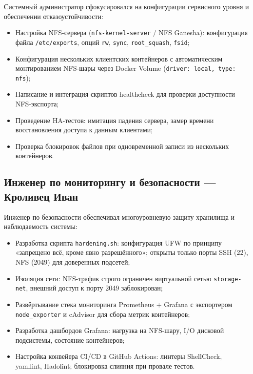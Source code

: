 \documentclass[14pt,a4paper]{extarticle}
\begin{document}
	Системный администратор сфокусировался на конфигурации сервисного уровня и
	обеспечении отказоустойчивости:
	
	\begin{itemize}
		\item Настройка NFS-сервера (\texttt{nfs-kernel-server} / NFS Ganesha): конфигурация
		файла \texttt{/etc/exports}, опций \texttt{rw}, \texttt{sync},
		\texttt{root\_squash}, \texttt{fsid};
		\item Конфигурация нескольких клиентских контейнеров с автоматическим монтированием
		NFS-шары через Docker Volume (\texttt{driver: local, type: nfs});
		\item Написание и интеграция скриптов healthcheck для проверки доступности
		NFS-экспорта;
		\item Проведение HA-тестов: имитация падения сервера, замер времени восстановления
		доступа к данным клиентами;
		\item Проверка блокировок файлов при одновременной записи из нескольких контейнеров.
	\end{itemize}
	
	\subsection{Инженер по мониторингу и безопасности --- Кроливец Иван}
	
	Инженер по безопасности обеспечивал многоуровневую защиту хранилища и наблюдаемость
	системы:
	
	\begin{itemize}
		\item Разработка скрипта \texttt{hardening.sh}: конфигурация UFW по принципу
		«запрещено всё, кроме явно разрешённого»; открыты только порты SSH (22),
		NFS (2049) для доверенных подсетей;
		\item Изоляция сети: NFS-трафик строго ограничен виртуальной сетью
		\texttt{storage-net}, внешний доступ к порту 2049 заблокирован;
		\item Развёртывание стека мониторинга Prometheus + Grafana с экспортером
		\texttt{node\_exporter} и cAdvisor для сбора метрик контейнеров;
		\item Разработка дашбордов Grafana: нагрузка на NFS-шару, I/O дисковой подсистемы,
		состояние контейнеров;
		\item Настройка конвейера CI/CD в GitHub Actions: линтеры ShellCheck, yamllint,
		Hadolint; блокировка слияния при провале тестов.
	\end{itemize}
	
\end{document}
